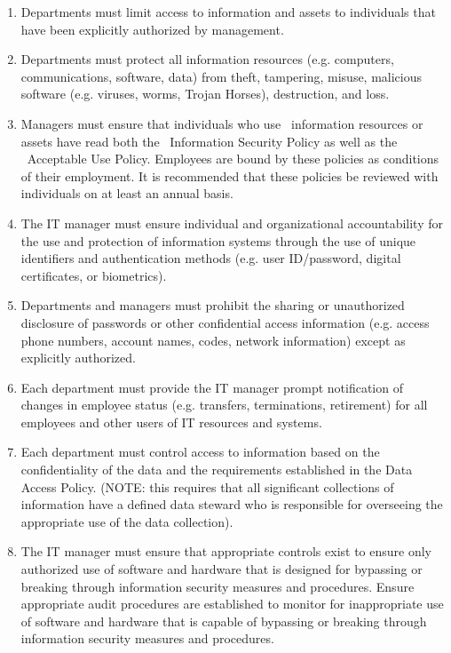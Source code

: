 \documentclass[sec]{policy}
\begin{document}
			\begin{enumerate}[label = \Alph*.]
				\item Departments must limit access to information and assets to individuals that have been explicitly authorized by management.
				\item Departments must protect all information resources (e.g. computers, communications, software, data) from theft, tampering, misuse, malicious software (e.g. viruses, worms, Trojan Horses), destruction, and loss.
				\item Managers must ensure that individuals who use \theOrganization\ information resources or assets have read both the \theOrganization\ Information Security Policy as well as the \theOrganization\ Acceptable Use Policy. Employees are bound by these policies as conditions of their employment.  It is recommended that these policies be reviewed with individuals on at least an annual basis.
				\item The IT manager must ensure individual and organizational accountability for the use and protection of information systems through the use of unique identifiers and authentication methods (e.g. user ID/password, digital certificates, or biometrics). 
				\item Departments and managers must prohibit the sharing or unauthorized disclosure of passwords or other confidential access information (e.g. access phone numbers, account names, codes, network information) except as explicitly authorized.
				\item Each department must provide the IT manager prompt notification of changes in employee status (e.g. transfers, terminations, retirement) for all employees and other users of IT resources and systems.
				\item Each department must control access to information based on the confidentiality of the data and the requirements established in the Data Access Policy. (NOTE: this requires that all significant collections of information have a defined data steward who is responsible for overseeing the appropriate use of the data collection).
				\item The IT manager must ensure that appropriate controls exist to ensure only authorized use of software and hardware that is designed for bypassing or breaking through information security measures and procedures. Ensure appropriate audit procedures are established to monitor for inappropriate use of software and hardware that is capable of bypassing or breaking through information security measures and procedures.

\end{enumerate}
\end{document}
